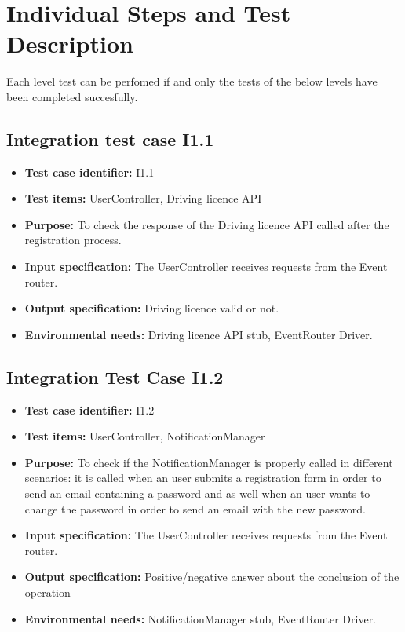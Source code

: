 \chapter{Individual Steps and Test Description}
Each level test can be perfomed if and only the tests of the below levels have been completed succesfully.

\section{Integration test case I1.1}

\begin{itemize}
\item \textbf{Test case identifier:} I1.1
\item \textbf{Test items:} UserController, Driving licence API
\item \textbf{Purpose:} To check the response of the Driving licence API called after the registration process.
\item \textbf{Input specification:} The UserController receives requests from the Event router.
\item \textbf{Output specification:} Driving licence valid or not.
\item \textbf{Environmental needs:} Driving licence API stub, EventRouter Driver.
\end{itemize}

\section{Integration Test Case I1.2}
\begin{itemize}
\item \textbf{Test case identifier:}  I1.2
\item \textbf{Test items:} UserController, NotificationManager
\item \textbf{Purpose:} To check if the NotificationManager is properly called in different scenarios: it is called when an user submits a registration form in order to send an email containing a password and as well when an user wants to change the password  in order to send an email with the new password.
\item \textbf{Input specification:} The UserController receives requests from the Event router.
\item \textbf{Output specification:} Positive/negative answer about the conclusion of the operation
\item \textbf{Environmental needs:} NotificationManager stub,  EventRouter Driver.
\end{itemize}


